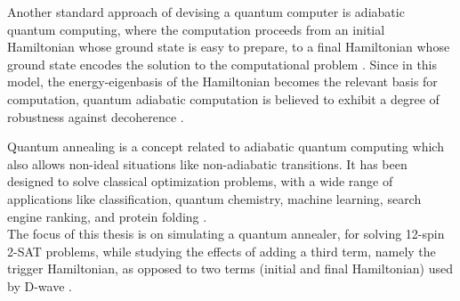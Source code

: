 \documentclass[main.tex]{subfiles}
\begin{document}
Another standard approach of devising a quantum computer is adiabatic quantum computing, where the computation proceeds from an initial Hamiltonian whose ground state is easy to prepare, to a final Hamiltonian whose ground state encodes the solution to the computational problem \cite{Albash_2018}. Since in this model, the energy-eigenbasis of the Hamiltonian becomes the relevant basis for computation, quantum adiabatic computation is believed to exhibit a degree of robustness against decoherence \cite{albash2015decoherence}.

Quantum annealing is a concept related to adiabatic quantum computing which also allows non-ideal situations like non-adiabatic transitions. It has been designed to solve classical optimization problems, with a wide range of applications like classification, quantum chemistry, machine learning, search engine ranking, and protein folding \cite{hauke2019perspectives}.\\

The focus of this thesis is on simulating a quantum annealer, for solving 12-spin 2-SAT problems, while studying the effects of adding a third term, namely the trigger Hamiltonian, as opposed to two terms (initial and final Hamiltonian) used by D-wave \cite{Albash_2018,hauke2019perspectives,farhi2002quantum,crosson2014different,hormozi2017nonstoquastic}.
\end{document}
